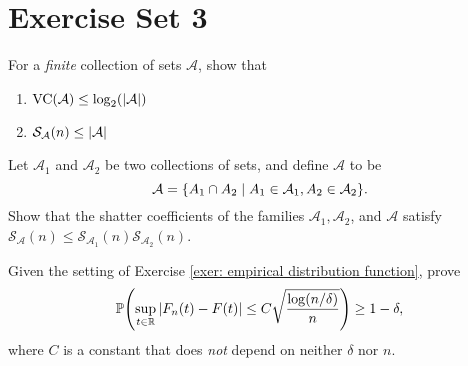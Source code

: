 \section{Exercise Set 3}

\begin{exercise}
For a \emph{finite} collection of sets $\mathcal{A}$, show that
\begin{enumerate}
    \item $\operatorname{VC}(\mathcal{A}) \leq \log_2(\abs{\mathcal{A}})$

    \item $\mathcal{S}_{\mathcal{A}}(n) \leq \abs{\mathcal{A}}$
\end{enumerate}
\end{exercise}


\begin{exercise}
Let $\mathcal{A}_1$ and $\mathcal{A}_2$ be two collections of sets, and define $\mathcal{A}$ to be
\[
    \mathcal{A} = \set{A_1 \cap A_2 \with A_1 \in \mathcal{A}_1, A_2 \in \mathcal{A}_2}.
\]
Show that the shatter coefficients of the families $\mathcal{A}_1, \mathcal{A}_2$, and $\mathcal{A}$ satisfy $\mathcal{S}_{\mathcal{A}}(n) \leq \mathcal{S}_{\mathcal{A}_1}(n) \mathcal{S}_{\mathcal{A}_2}(n)$.
\end{exercise}


\begin{exercise}
Given the setting of Exercise \ref{exer: empirical distribution function}, prove
\[
    \P\left(\sup_{t \in \R} \abs{F_n(t) - F(t)} \leq C \sqrt{\frac{\log(n / \delta)}{n}}\right) \geq 1 - \delta,
\]
where $C$ is a constant that does \emph{not} depend on neither $\delta$ nor $n$.
\end{exercise}
